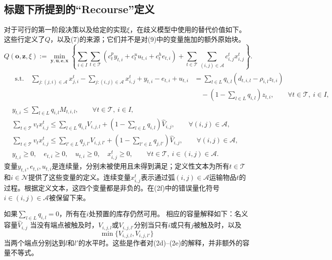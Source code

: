 \documentclass{article}
\begin{document}
\subsection*{标题下所提到的“Recourse”定义}
对于可行的第一阶段决策以及给定的实现$\xi$，在歧义模型中使用的替代价值如下。这些行定义了$Q$，以及(7)的来源；它们并不是对(9)中的变量施加的额外原始块。
\begin{equation}
Q(\boldsymbol o,\boldsymbol z,\xi):=
\min_{\boldsymbol y,\boldsymbol u,\boldsymbol e,\boldsymbol x}
\left\{\sum_{i\in I}\sum_{t\in\mathcal T}
(c_t^p y_{t,i}+c_t^u u_{t,i}+c_t^h e_{t,i})
+\sum_{t\in\mathcal T}\sum_{(i,j)\in\mathcal A}c^t_{i,j}x^t_{i,j}\right\}.
\tag{2a}
\end{equation}
\begin{align}
&\begin{aligned}
\text{s.t.}\quad
\sum_{j:(j,i)\in\mathcal A}x^t_{j,i}
-\sum_{j:(i,j)\in\mathcal A}x^t_{i,j}
+y_{t,i}-e_{t,i}+u_{t,i}
&=\sum_{l\in L}q_{i,l}(d_{t,i,l}-\rho_{i,l}z_{t,i})\\
&\quad-\left(1-\sum_{l\in L}q_{i,l}\right)z_{t,i},
\qquad\forall t\in\mathcal T,\ i\in I,
\end{aligned}\tag{2b}\\
&y_{t,i}\leq\sum_{l\in L}q_{i,l}M_{t,i,l},
\qquad\forall t\in\mathcal T,\ i\in I,\tag{2c}\\
&\sum_{t\in\mathcal T}v_t x^t_{i,j}
\leq\sum_{l\in L}q_{i,l}V_{i,j,l}
+\left(1-\sum_{l\in L}q_{i,l}\right)\hat V_{i,j},
\qquad\forall(i,j)\in\mathcal A,\tag{2d}\\
&\sum_{t\in\mathcal T}v_t x^t_{i,j}
\leq\sum_{l'\in L}q_{j,l'}V_{i,j,l'}
+\left(1-\sum_{l'\in L}q_{j,l'}\right)\hat V_{i,j},
\qquad\forall(i,j)\in\mathcal A,\tag{2e}\\
&y_{t,i}\geq0,\quad e_{t,i}\geq0,\quad u_{t,i}\geq0,\quad x^t_{i,j}\geq0,
\qquad\forall t\in\mathcal T,\ i\in(i,j)\in\mathcal A.\tag{2f}
\end{align}
变量$y_{t,i},e_{t,i},u_{t,i}$是连续量，分别未被使用且未得到满足；定义性文本为所有$t\in\mathcal T$和$i\in\mathcal N$提供了这些变量的定义。连续变量$x^t_{i,j}$表示通过弧$(i,j)\in\mathcal A$运输物品$t$的过程。根据定义文本，这四个变量都是非负的。在(2f)中的错误量化符号$i\in(i,j)\in\mathcal A$被保留下来。

如果$\sum_{l\in L}q_{i,l}=0$，所有在$i$处预置的库存仍然可用。
相应的容量解释如下：名义容量$\hat V_{i,j}$
当没有端点被触及时，$V_{i,j,l}$或$V_{i,j,l'}$分别当只有$i$或只有$j$被触及时，以及
\[
\min\{V_{i,j,l},V_{i,j,l'}\}
\]
当两个端点分别达到$l$和$l'$的水平时。这些是作者对(2d)--(2e)的解释，并非额外的容量不等式。
\end{document}
